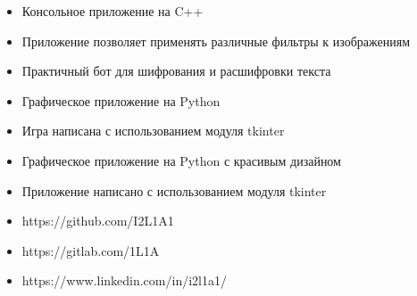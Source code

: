 
\begin{itemize}
\item Консольное приложение на C++
\item Приложение позволяет применять различные фильтры к изображениям
\end{itemize}
\smallskip
{}
\begin{itemize}
\item Практичный бот для шифрования и расшифровки текста
\end{itemize}
\smallskip
{}
\begin{itemize}
\item Графическое приложение на Python
\item Игра написана с использованием модуля tkinter
\end{itemize}
\smallskip
{}
\begin{itemize}
\item Графическое приложение на Python с красивым дизайном
\item Приложение написано с использованием модуля tkinter
\end{itemize}
\smallskip

\begin{itemize}
\item{https://github.com/I2L1A1}
\end{itemize}
\smallskip

\begin{itemize}
\item{https://gitlab.com/1L1A}
\end{itemize}
\smallskip
\divider

\begin{itemize}
\item{https://www.linkedin.com/in/i2l1a1/}
\end{itemize}